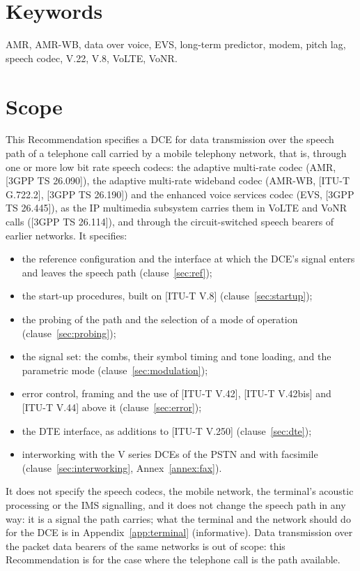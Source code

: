 \documentclass[a4paper,11pt]{article}
\newcounter{annex}
\newcommand{\rec}[1]{[ITU-T #1]}
\newcommand{\tgpp}[1]{[3GPP TS #1]}
\begin{document}
\section*{Keywords}
AMR, AMR-WB, data over voice, EVS, long-term predictor, modem, pitch
lag, speech codec, V.22, V.8, VoLTE, VoNR.

\clearpage
\thispagestyle{plain}
\tableofcontents
\clearpage

\section{Scope}
This Recommendation specifies a DCE for data transmission over the speech
path of a telephone call carried by a mobile telephony network, that is,
through one or more low bit rate speech codecs: the adaptive multi-rate
codec (AMR, \tgpp{26.090}), the adaptive multi-rate wideband codec
(AMR-WB, \rec{G.722.2}, \tgpp{26.190}) and the enhanced voice services
codec (EVS, \tgpp{26.445}), as the IP multimedia subsystem carries them in
VoLTE and VoNR calls (\tgpp{26.114}), and through the circuit-switched
speech bearers of earlier networks.  It specifies:
\begin{itemize}
\item the reference configuration and the interface at which the DCE's
  signal enters and leaves the speech path (clause~\ref{sec:ref});
\item the start-up procedures, built on \rec{V.8} (clause~\ref{sec:startup});
\item the probing of the path and the selection of a mode of operation
  (clause~\ref{sec:probing});
\item the signal set: the combs, their symbol timing and tone loading,
  and the parametric mode (clause~\ref{sec:modulation});
\item error control, framing and the use of \rec{V.42}, \rec{V.42bis} and
  \rec{V.44} above it (clause~\ref{sec:error});
\item the DTE interface, as additions to \rec{V.250} (clause~\ref{sec:dte});
\item interworking with the V series DCEs of the PSTN and with facsimile
  (clause~\ref{sec:interworking}, Annex~\ref{annex:fax}).
\end{itemize}
It does not specify the speech codecs, the mobile network, the terminal's
acoustic processing or the IMS signalling, and it does not change the
speech path in any way: it is a signal the path carries; what the terminal and the
network should do for the DCE is in Appendix~\ref{app:terminal}
(informative).  Data transmission over the packet data bearers of the same
networks is out of scope: this Recommendation is for the case where the
telephone call is the path available.
\end{document}
